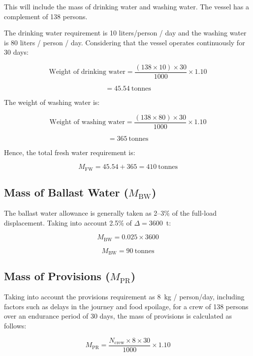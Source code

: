 \documentclass[12pt,a4paper,twoside]{report}
\begin{document}
This will include the mass of drinking water and washing water.
The vessel has a complement of 138 persons.

\vspace{\baselineskip}\par\noindent The drinking water requirement is 10 liters/person / day and
the washing water is 80 liters / person / day. Considering that the vessel
operates continuously for 30 days:

\[
\text{Weight of drinking water}
=
\frac{(138 \times 10)\times 30}{1000}
\times 1.10
\]

\[
= 45.54~\text{tonnes}
\]

\vspace{\baselineskip}\par\noindent The weight of washing water is:

\[
\text{Weight of washing water}
=
\frac{(138 \times 80)\times 30}{1000}
\times 1.10
\]

\[
= 365~\text{tonnes}
\]

\vspace{\baselineskip}\par\noindent Hence, the total fresh water requirement is:

\[
M_{\mathrm{FW}}
=
45.54 + 365
=
410~\text{tonnes}
\]


\subsection{Mass of Ballast Water (\texorpdfstring{$M_{\mathrm{BW}}$}{MBW})}

The ballast water allowance is generally taken as 2--3\% of the
full-load displacement. Taking into account 2.5\% of $\Delta = 3600$~t:

\[
M_{\mathrm{BW}}
=
0.025 \times 3600
\]

\[
M_{\mathrm{BW}} = 90~\text{tonnes}
\]


\subsection{Mass of Provisions (\texorpdfstring{$M_{\mathrm{PR}}$}{MPR})}

Taking into account the provisions requirement as 8~kg / person/day, including
factors such as delays in the journey and food spoilage, for a crew
of 138 persons over an endurance period of 30 days, the mass of
provisions is calculated as follows:

\begin{equation}
M_{\mathrm{PR}}
=
\frac{N_{\mathrm{crew}} \times 8 \times 30}{1000}
\times 1.10
\end{equation}
\end{document}
